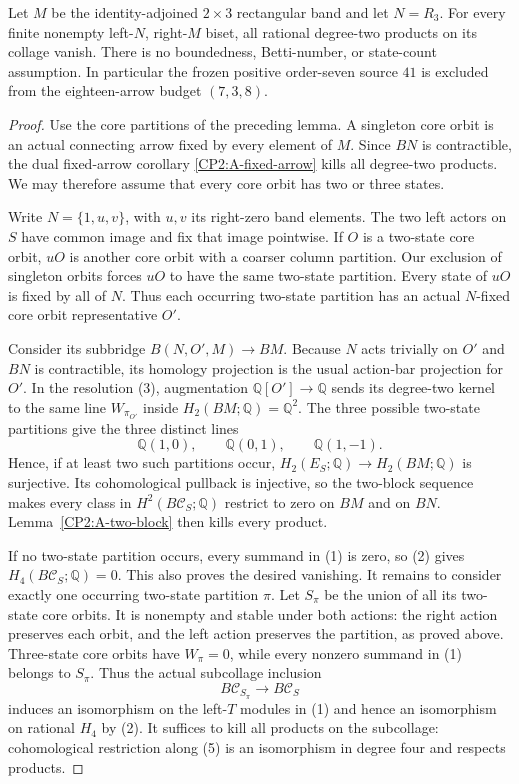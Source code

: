 \begin{theorem}
\label{CP2:A-two-by-three-band-right-zero-all-states}
Let $M$ be the identity-adjoined $2\times3$ rectangular
band and let $N=R_3$.  For every finite nonempty
left-$N$, right-$M$ biset, all rational degree-two
products on its collage vanish.  There is no
boundedness, Betti-number, or state-count assumption.
In particular the frozen positive order-seven source
$41$ is excluded from the eighteen-arrow budget
$(7,3,8)$.
\end{theorem}
\begin{proof}
Use the core partitions of the preceding lemma.
A singleton core orbit is an actual connecting arrow
fixed by every element of $M$.  Since $BN$ is
contractible, the dual fixed-arrow corollary
\ref{CP2:A-fixed-arrow} kills all degree-two products.
We may therefore assume that every core orbit has
two or three states.

Write $N=\{1,u,v\}$, with $u,v$ its right-zero
band elements.  The two left actors on $S$ have
common image and fix that image pointwise.  If $O$
is a two-state core orbit, $uO$ is another core
orbit with a coarser column partition.  Our exclusion
of singleton orbits forces $uO$ to have the same
two-state partition.  Every state of $uO$ is fixed
by all of $N$.  Thus each occurring two-state
partition has an actual $N$-fixed core orbit
representative $O'$.

Consider its subbridge $B(N,O',M)\to BM$.
Because $N$ acts trivially on $O'$ and $BN$ is
contractible, its homology projection is the usual
action-bar projection for $O'$.
In the resolution (3), augmentation
$\mathbb Q[O']\to\mathbb Q$ sends its degree-two
kernel to the same line $W_{\pi_{O'}}$ inside
$H_2(BM;\mathbb Q)=\mathbb Q^2$.
The three possible two-state partitions give the
three distinct lines
\[
 \mathbb Q(1,0),\qquad
 \mathbb Q(0,1),\qquad
 \mathbb Q(1,-1).
                                                               \tag{4}
\]
Hence, if at least two such partitions occur,
$H_2(E_S;\mathbb Q)\to H_2(BM;\mathbb Q)$ is
surjective.  Its cohomological pullback is injective,
so the two-block sequence makes every class in
$H^2(B\mathcal C_S;\mathbb Q)$ restrict to zero
on $BM$ and on $BN$.
Lemma~\ref{CP2:A-two-block} then kills every product.

If no two-state partition occurs, every summand in
(1) is zero, so (2) gives $H_4(B\mathcal C_S;\mathbb Q)=0$.
This also proves the desired vanishing.
It remains to consider exactly one occurring two-state
partition $\pi$.
Let $S_\pi$ be the union of all its two-state core
orbits.  It is nonempty and stable under both actions:
the right action preserves each orbit, and the left
action preserves the partition, as proved above.
Three-state core orbits have $W_\pi=0$, while every
nonzero summand in (1) belongs to $S_\pi$.
Thus the actual subcollage inclusion
\[
 B\mathcal C_{S_\pi}\longrightarrow B\mathcal C_S
                                                               \tag{5}
\]
induces an isomorphism on the left-$T$ modules in (1)
and hence an isomorphism on rational $H_4$ by (2).
It suffices to kill all products on the subcollage:
cohomological restriction along (5) is an isomorphism
in degree four and respects products.


\end{proof}
